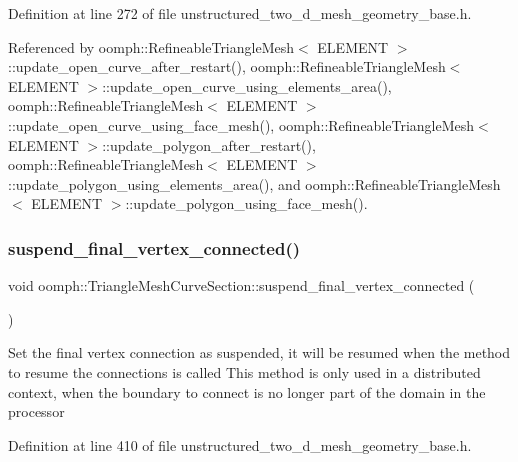 Definition at line 272 of file unstructured\+\_\+two\+\_\+d\+\_\+mesh\+\_\+geometry\+\_\+base.\+h.



Referenced by oomph\+::\+Refineable\+Triangle\+Mesh$<$ E\+L\+E\+M\+E\+N\+T $>$\+::update\+\_\+open\+\_\+curve\+\_\+after\+\_\+restart(), oomph\+::\+Refineable\+Triangle\+Mesh$<$ E\+L\+E\+M\+E\+N\+T $>$\+::update\+\_\+open\+\_\+curve\+\_\+using\+\_\+elements\+\_\+area(), oomph\+::\+Refineable\+Triangle\+Mesh$<$ E\+L\+E\+M\+E\+N\+T $>$\+::update\+\_\+open\+\_\+curve\+\_\+using\+\_\+face\+\_\+mesh(), oomph\+::\+Refineable\+Triangle\+Mesh$<$ E\+L\+E\+M\+E\+N\+T $>$\+::update\+\_\+polygon\+\_\+after\+\_\+restart(), oomph\+::\+Refineable\+Triangle\+Mesh$<$ E\+L\+E\+M\+E\+N\+T $>$\+::update\+\_\+polygon\+\_\+using\+\_\+elements\+\_\+area(), and oomph\+::\+Refineable\+Triangle\+Mesh$<$ E\+L\+E\+M\+E\+N\+T $>$\+::update\+\_\+polygon\+\_\+using\+\_\+face\+\_\+mesh().

\mbox{\label{classoomph_1_1TriangleMeshCurveSection_a379677086ad13d5cd7d0c5c669a37e2f}} 
\subsubsection{\texorpdfstring{suspend\+\_\+final\+\_\+vertex\+\_\+connected()}{suspend\_final\_vertex\_connected()}}
{\footnotesize\ttfamily void oomph\+::\+Triangle\+Mesh\+Curve\+Section\+::suspend\+\_\+final\+\_\+vertex\+\_\+connected (\begin{DoxyParamCaption}{ }\end{DoxyParamCaption})\hspace{0.3cm}{\ttfamily [inline]}}

Set the final vertex connection as suspended, it will be resumed when the method to resume the connections is called This method is only used in a distributed context, when the boundary to connect is no longer part of the domain in the processor 

Definition at line 410 of file unstructured\+\_\+two\+\_\+d\+\_\+mesh\+\_\+geometry\+\_\+base.\+h.



